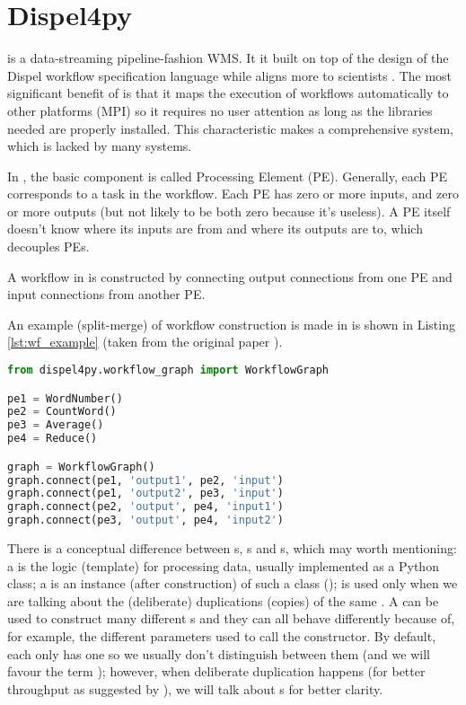 \section{Dispel4py}
\Dpy is a data-streaming pipeline-fashion WMS. It it built on top of the design of the Dispel workflow specification language \cite{atkinson2012data} while aligns more to scientists \cite{doi:10.1177/1094342016649766}. The most significant benefit of \dpy is that it maps the execution of workflows automatically to other platforms (\eg MPI) so it requires no user attention as long as the libraries needed are properly installed. This characteristic makes \dpy a comprehensive system, which is lacked by many systems.

In \dpy, the basic component is called Processing Element (PE). Generally, each PE corresponds to a task in the workflow. Each PE has zero or more inputs, and zero or more outputs (but not likely to be both zero because it's useless). A PE itself doesn't know where its inputs are from and where its outputs are to, which decouples PEs.

A workflow in \dpy is constructed by connecting output connections from one PE and input connections from another PE.

An example (split-merge) of workflow construction is made in \dpy is shown in Listing \ref{lst:wf_example} (taken from the original \dpy paper \cite{doi:10.1177/1094342016649766}).

\begin{lstlisting}[frame=single,caption={Example code of workflow construction in \dpy},captionpos=b,label={lst:wf_example},language=Python]
from dispel4py.workflow_graph import WorkflowGraph

pe1 = WordNumber()
pe2 = CountWord()
pe3 = Average()
pe4 = Reduce()

graph = WorkflowGraph()
graph.connect(pe1, 'output1', pe2, 'input')
graph.connect(pe1, 'output2', pe3, 'input')
graph.connect(pe2, 'output', pe4, 'input1')
graph.connect(pe3, 'output', pe4, 'input2')
\end{lstlisting}


There is a conceptual difference between \tPETmpl{}s, \tPEInst{}s and \tPEDup{}s, which may worth mentioning: a \tPETmpl is the logic (template) for processing data, usually implemented as a Python class; a \tPEInst is an instance (after construction) of such a class (\tPETmpl); \tPEDup is used only when we are talking about the (deliberate) duplications (copies) of the same \tPEInst. A \tPETmpl can be used to construct many different \tPEInst{}s and they can all behave differently because of, for example, the different parameters used to call the constructor. By default, each \tPEInst only has one \tPEDup so we usually don't distinguish between them (and we will favour the term \tPEInst); however, when deliberate duplication happens (\eg for better throughput as suggested by \citeauthor{doi:10.1177/1094342016649766} \cite{doi:10.1177/1094342016649766}), we will talk about \tPEDup{}s for better clarity.

